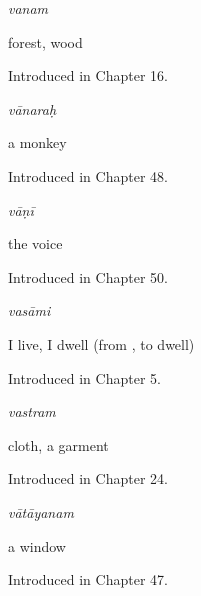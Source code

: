 \noindent\begin{minipage}[t]{\linewidth}
\raggedright
\textbf{}\enspace\emph{vanam}\par
\small forest, wood\par
\footnotesize Introduced in Chapter 16.
\end{minipage}\par\medskip

\noindent\begin{minipage}[t]{\linewidth}
\raggedright
\textbf{}\enspace\emph{vānaraḥ}\par
\small a monkey\par
\footnotesize Introduced in Chapter 48.
\end{minipage}\par\medskip

\noindent\begin{minipage}[t]{\linewidth}
\raggedright
\textbf{}\enspace\emph{vāṇī}\par
\small the voice\par
\footnotesize Introduced in Chapter 50.
\end{minipage}\par\medskip

\noindent\begin{minipage}[t]{\linewidth}
\raggedright
\textbf{}\enspace\emph{vasāmi}\par
\small I live, I dwell (from , to dwell)\par
\footnotesize Introduced in Chapter 5.
\end{minipage}\par\medskip

\noindent\begin{minipage}[t]{\linewidth}
\raggedright
\textbf{}\enspace\emph{vastram}\par
\small cloth, a garment\par
\footnotesize Introduced in Chapter 24.
\end{minipage}\par\medskip

\noindent\begin{minipage}[t]{\linewidth}
\raggedright
\textbf{}\enspace\emph{vātāyanam}\par
\small a window\par
\footnotesize Introduced in Chapter 47.
\end{minipage}\par\medskip

